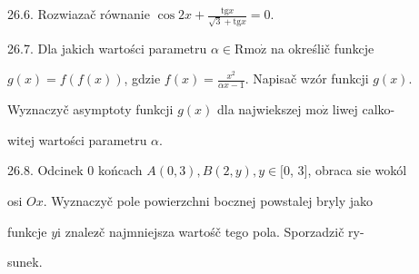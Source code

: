 \documentclass[a4paper,12pt]{article}
\begin{document}
26.6. Rozwiazač równanie $\displaystyle \cos 2x+\frac{\mathrm{t}\mathrm{g}x}{\sqrt{3}+\mathrm{t}\mathrm{g}x}=0.$

26.7. Dla jakich wartości parametru $\alpha \in \mathrm{R} \mathrm{m}\mathrm{o}\dot{\mathrm{z}}$ na określič funkcje

$g(x) = f(f(x))$, gdzie $f(x) = \displaystyle \frac{x^{2}}{\alpha x-1}$. Napisač wzór funkcji $g(x).$

Wyznaczyč asymptoty funkcji $g(x)$ dla najwiekszej $\mathrm{m}\mathrm{o}\dot{\mathrm{z}}$ liwej calko-

witej wartości parametru $\alpha.$

26.8. Odcinek $0$ końcach $A(0,3), B(2,y), y \in [0$, 3$]$, obraca $\mathrm{s}\mathrm{i}\mathrm{e}$ wokól

osi $Ox$. Wyznaczyč pole powierzchni bocznej powstalej bryly jako

funkcje $y \mathrm{i}$ znalez$\acute{}$č najmniejsza wartośč tego pola. Sporzadzič ry-

sunek.
\end{document}
